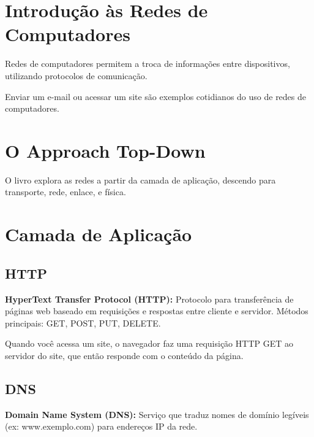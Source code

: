 \section{Introdução às Redes de Computadores}
\begin{defbox}
Redes de computadores permitem a troca de informações entre dispositivos, utilizando protocolos de comunicação.
\end{defbox}

\begin{examplebox}
Enviar um e-mail ou acessar um site são exemplos cotidianos do uso de redes de computadores.
\end{examplebox}

\section{O Approach Top-Down}
\begin{notebox}
O livro explora as redes a partir da camada de aplicação, descendo para transporte, rede, enlace, e física.
\end{notebox}

\section{Camada de Aplicação}

\subsection{HTTP}
\begin{protocolbox}
\textbf{HyperText Transfer Protocol (HTTP):} Protocolo para transferência de páginas web baseado em requisições e respostas entre cliente e servidor. Métodos principais: GET, POST, PUT, DELETE.
\end{protocolbox}

\begin{examplebox}
Quando você acessa um site, o navegador faz uma requisição HTTP GET ao servidor do site, que então responde com o conteúdo da página.
\end{examplebox}

\subsection{DNS}
\begin{protocolbox}
\textbf{Domain Name System (DNS):} Serviço que traduz nomes de domínio legíveis (ex: www.exemplo.com) para endereços IP da rede.
\end{protocolbox}

